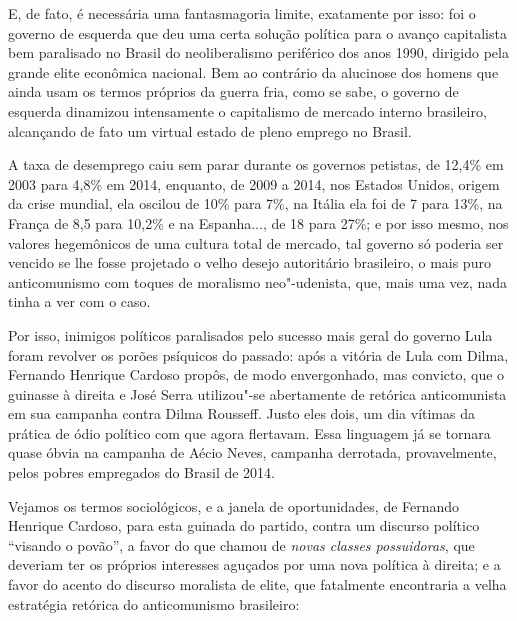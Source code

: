 E, de fato, é necessária uma fantasmagoria limite, exatamente por isso:
foi o governo de esquerda que deu uma certa solução política para o
avanço capitalista bem paralisado no Brasil do neoliberalismo periférico
dos anos 1990, dirigido pela grande elite econômica nacional. Bem ao
contrário da alucinose dos homens que ainda usam os termos próprios da
guerra fria, como se sabe, o governo de esquerda dinamizou intensamente
o capitalismo de mercado interno brasileiro, alcançando de fato um
virtual estado de pleno emprego no Brasil.

A taxa de desemprego caiu sem parar durante os governos petistas, de
12,4\% em 2003 para 4,8\% em 2014, enquanto, de 2009 a 2014, nos Estados
Unidos, origem da crise mundial, ela oscilou de 10\% para 7\%, na Itália
ela foi de 7 para 13\%, na França de 8,5 para 10,2\% e na Espanha..., de
18 para 27\%; e por isso mesmo, nos valores hegemônicos de uma cultura
total de mercado, tal governo só poderia ser vencido se lhe fosse
projetado o velho desejo autoritário brasileiro, o mais puro
anticomunismo com toques de moralismo neo"-udenista, que, mais uma vez,
nada tinha a ver com o caso.

Por isso, inimigos políticos paralisados pelo sucesso mais geral do
governo Lula foram revolver os porões psíquicos do passado: após a
vitória de Lula com Dilma, Fernando Henrique Cardoso propôs, de modo
envergonhado, mas convicto, que o  guinasse à direita e José Serra
utilizou"-se abertamente de retórica anticomunista em sua campanha contra
Dilma Rousseff. Justo eles dois, um dia vítimas da prática de ódio
político com que agora flertavam. Essa linguagem já se tornara quase
óbvia na campanha de Aécio Neves, campanha derrotada, provavelmente,
pelos pobres empregados do Brasil de 2014.

Vejamos os termos sociológicos, e a janela de oportunidades, de Fernando
Henrique Cardoso, para esta guinada do partido, contra um discurso
político ``visando o povão'', a favor do que chamou de \emph{novas
classes possuidoras}, que deveriam ter os próprios interesses aguçados
por uma nova política à direita; e a favor do acento do discurso
moralista de elite, que fatalmente encontraria a velha estratégia
retórica do anticomunismo brasileiro:

